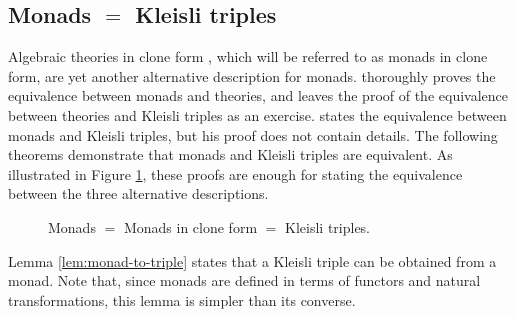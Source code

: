 \subsection*{Monads $=$ Kleisli triples}

Algebraic theories in clone form \parencite[24]{manes-1976}, which
will be referred to as monads in clone form, are yet another
alternative description for monads. \textcite[26--29]{manes-1976}
thoroughly proves the equivalence between monads and theories, and
leaves the proof of the equivalence between theories and Kleisli triples as an
exercise. \textcite[61]{moggi-1991} states the equivalence between
monads and Kleisli triples, but his proof does not contain details. The
following theorems demonstrate that monads and Kleisli triples are equivalent.
As illustrated in Figure \ref{fig:monad-theory-triple}, these proofs
are enough for stating the equivalence between the three alternative
descriptions.

\begin{figure}[htbp]
  \begin{center}
  \end{center}
  \caption{Monads $=$ Monads in clone form $=$ Kleisli triples.}
  \label{fig:monad-theory-triple}
\end{figure}

Lemma \ref{lem:monad-to-triple} states that a Kleisli triple can be obtained
from a monad. Note that, since monads are defined in terms of functors
and natural transformations, this lemma is simpler than its converse.

